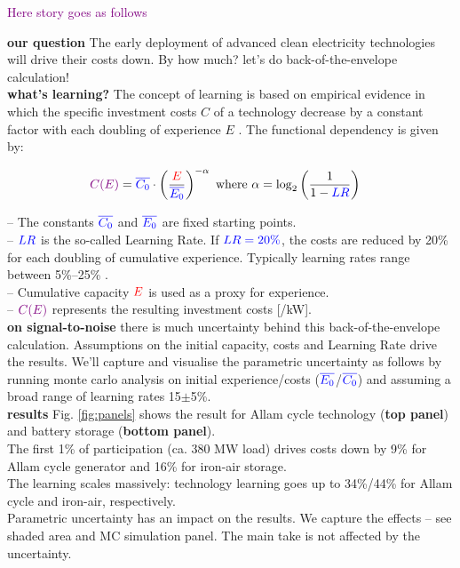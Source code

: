 \documentclass[pdflatex,sn-basic, Numbered]{sn-jnl}%
\theoremstyle{thmstyleone}%
\theoremstyle{thmstyletwo}%
\theoremstyle{thmstylethree}%
\newcommand{\comment}[1]{\textcolor{purple}{#1}}
\begin{document}
\comment{Here story goes as follows}

\noindent\textbf{our question} The early deployment of advanced clean electricity technologies will drive their costs down. By how much? let's do back-of-the-envelope calculation! \\

\noindent\textbf{what's learning?} The concept of learning is based on empirical evidence in which the speciﬁc investment costs $C$ of a technology decrease by a constant factor with each doubling of experience $E$ \cite{wayEmpiricallyGroundedTechnology2022a}. The functional dependency is given by:

\begin{equation}
  \begin{aligned}
    \color{violet}C(E)\color{black} &= \color{blue}\overline{C_0}\color{black}  \cdot \left( \frac{\color{red}E}{\color{blue}\overline{E_0}\color{black}} \right)^{-\color{black}\alpha} \text{ where } \color{black}\alpha = \color{black}\log_2 \left( \frac{1}{1 - \color{blue}LR\color{black}} \right)
  \end{aligned}
\end{equation}

\noindent-- The constants $\color{blue}\overline{C_0}$ and $\color{blue}\overline{E_0}$ are fixed starting points. \\
-- $\color{blue}LR$ is the so-called Learning Rate. If $\color{blue}LR=20\%$, the costs are reduced by 20\% for each doubling of cumulative experience. Typically learning rates range between 5\%--25\% \cite{waySuppplementaryMaterialsEmpirically2022}.\\
-- Cumulative capacity $\color{red}E$ is used as a proxy for experience. \\
-- $\color{violet}C(E)\color{black}$ represents the resulting investment costs [\officialeuro/kW]. \\

\noindent\textbf{on signal-to-noise} there is much uncertainty behind this back-of-the-envelope calculation. Assumptions on the initial capacity, costs and Learning Rate drive the results. We'll capture and visualise the parametric uncertainty as follows by running monte carlo analysis on initial experience/costs ($\color{blue}\overline{E_0}\color{black}$/$\color{blue}\overline{C_0}\color{black}$) and assuming a broad range of learning rates 15$\pm$5\%. \\

\noindent\textbf{results} Fig. \ref{fig:panels} shows the result for Allam cycle technology (\textbf{top panel}) and battery storage (\textbf{bottom panel}). \\
The first 1\% of participation (ca. 380 MW load) drives costs down by 9\% for Allam cycle generator and 16\% for iron-air storage. \\
The learning scales massively: technology learning goes up to 34\%/44\% for Allam cycle and  iron-air, respectively.\\
Parametric uncertainty has an impact on the results. We capture the effects -- see shaded area and MC simulation panel. The main take is not affected by the uncertainty.\\
\end{document}
